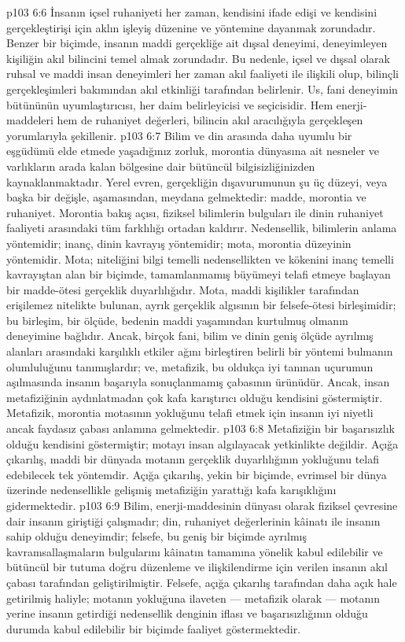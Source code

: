 \vs p103 6:6 İnsanın içsel ruhaniyeti her zaman, kendisini ifade edişi ve kendisini gerçekleştirişi için aklın işleyiş düzenine ve yöntemine dayanmak zorundadır. Benzer bir biçimde, insanın maddi gerçekliğe ait dışsal deneyimi, deneyimleyen kişiliğin akıl bilincini temel almak zorundadır. Bu nedenle, içsel ve dışsal olarak ruhsal ve maddi insan deneyimleri her zaman akıl faaliyeti ile ilişkili olup, bilinçli gerçekleşimleri bakımından akıl etkinliği tarafından belirlenir. Us, fani deneyimin bütününün uyumlaştırıcısı, her daim belirleyicisi ve seçicisidir. Hem enerji\hyp{}maddeleri hem de ruhaniyet değerleri, bilincin akıl aracılığıyla gerçekleşen yorumlarıyla şekillenir.
\vs p103 6:7 Bilim ve din arasında daha uyumlu bir eşgüdümü elde etmede yaşadığınız zorluk, morontia dünyasına ait nesneler ve varlıkların arada kalan bölgesine dair bütüncül bilgisizliğinizden kaynaklanmaktadır. Yerel evren, gerçekliğin dışavurumunun şu üç düzeyi, veya başka bir değişle, aşamasından, meydana gelmektedir: madde, morontia ve ruhaniyet. Morontia bakış açısı, fiziksel bilimlerin bulguları ile dinin ruhaniyet faaliyeti arasındaki tüm farklılığı ortadan kaldırır. Nedensellik, bilimlerin anlama yöntemidir; inanç, dinin kavrayış yöntemidir; mota, morontia düzeyinin yöntemidir. Mota; niteliğini bilgi temelli nedensellikten ve kökenini inanç temelli kavrayıştan alan bir biçimde, tamamlanmamış büyümeyi telafi etmeye başlayan bir madde\hyp{}ötesi gerçeklik duyarlılığıdır. Mota, maddi kişilikler tarafından erişilemez nitelikte bulunan, ayrık gerçeklik algısının bir felsefe\hyp{}ötesi birleşimidir; bu birleşim, bir ölçüde, bedenin maddi yaşamından kurtulmuş olmanın deneyimine bağlıdır. Ancak, birçok fani, bilim ve dinin geniş ölçüde ayrılmış alanları arasındaki karşılıklı etkiler ağını birleştiren belirli bir yöntemi bulmanın olumluluğunu tanımışlardır; ve, metafizik, bu oldukça iyi tanınan uçurumun aşılmasında insanın başarıyla sonuçlanmamış çabasının ürünüdür. Ancak, insan metafiziğinin aydınlatmadan çok kafa karıştırıcı olduğu kendisini göstermiştir. Metafizik, morontia motasının yokluğunu telafi etmek için insanın iyi niyetli ancak faydasız çabası anlamına gelmektedir.
\vs p103 6:8 Metafiziğin bir başarısızlık olduğu kendisini göstermiştir; motayı insan algılayacak yetkinlikte değildir. Açığa çıkarılış, maddi bir dünyada motanın gerçeklik duyarlılığının yokluğunu telafi edebilecek tek yöntemdir. Açığa çıkarılış, yekin bir biçimde, evrimsel bir dünya üzerinde nedensellikle gelişmiş metafiziğin yarattığı kafa karışıklığını gidermektedir.
\vs p103 6:9 Bilim, enerji\hyp{}maddesinin dünyası olarak fiziksel çevresine dair insanın giriştiği çalışmadır; din, ruhaniyet değerlerinin kâinatı ile insanın sahip olduğu deneyimdir; felsefe, bu geniş bir biçimde ayrılmış kavramsallaşmaların bulgularını kâinatın tamamına yönelik kabul edilebilir ve bütüncül bir tutuma doğru düzenleme ve ilişkilendirme için verilen insanın akıl çabası tarafından geliştirilmiştir. Felsefe, açığa çıkarılış tarafından daha açık hale getirilmiş haliyle; motanın yokluğuna ilaveten --- metafizik olarak --- motanın yerine insanın getirdiği nedensellik denginin iflası ve başarısızlığının olduğu durumda kabul edilebilir bir biçimde faaliyet göstermektedir.
